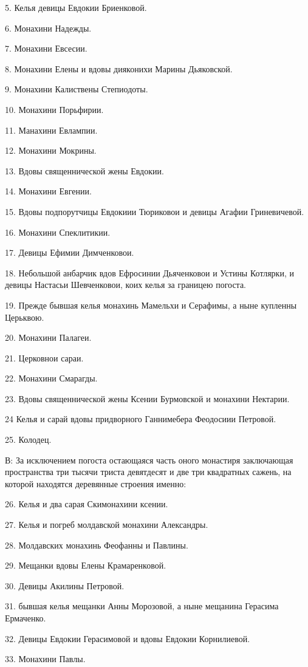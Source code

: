 5. Келья девицы Евдокии Бриенковой.

6. Монахини Надежды.

7. Монахини Евсесии.

8. Монахини Елены и вдовы дияконихи Марины Дьяковской.

9. Монахини Калиствены Степиодоты.

10. Монахини Порьфирии.

11. Манахини Евлампии.

12. Монахини Мокрины.

13. Вдовы священнической жены Евдокии.

14. Монахини Евгении.

15. Вдовы подпорутчицы Евдокиии Тюриковои и девицы Агафии Гриневичевой.

16. Монахини Спеклитикии.

17. Девицы Ефимии Димченковои.

18. Небольшой анбарчик вдов Ефросинии Дьяченковои и Устины Котлярки, и девицы Настасьи Шевченковои, коих келья за границею погоста.

19. Прежде бывшая келья монахинь Мамельхи и Серафимы, а ныне купленны Церьквою.

20. Монахини Палагеи.

21. Церковнои сараи.

22. Монахини Смарагды.

23. Вдовы священнической жены Ксении Бурмовской и монахини Нектарии.

24 Келья и сарай вдовы придворного Ганнимебера Феодосиии Петровой.

25. Колодец.

В: За исключением погоста остающаяся часть оного монастиря заключающая пространства три тысячи триста девятдесят и две три квадратных сажень, на которой находятся деревянные строения именно:

26. Келья и два сарая Скимонахини ксении.

27. Келья и погреб молдавской монахини Александры.

28. Молдавских монахинь Феофанны и Павлины.

29. Мещанки вдовы Елены Крамаренковой.

30. Девицы Акилины Петровой.

31. бывшая келья мещанки Анны Морозовой, а ныне мещанина Герасима Ермаченко.

32. Девицы Евдокии Герасимовой и вдовы Евдокии Корнилиевой.

33. Монахини Павлы.

